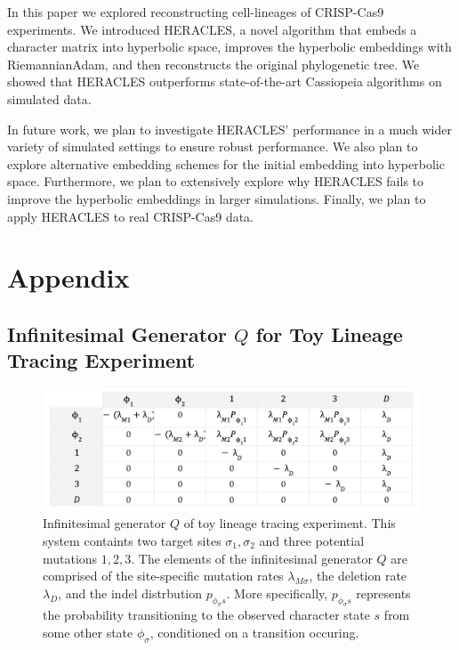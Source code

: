 \documentclass{article}
\begin{document}
In this paper we explored reconstructing cell-lineages of CRISP-Cas9 experiments. We introduced HERACLES, a novel algorithm that embeds a character matrix into hyperbolic space, improves the hyperbolic embeddings with RiemannianAdam, and then reconstructs the original phylogenetic tree. We showed that HERACLES outperforms state-of-the-art Cassiopeia algorithms on simulated data.

In future work, we plan to investigate HERACLES' performance in a much wider variety of simulated settings to ensure robust performance. We also plan to explore alternative embedding schemes for the initial embedding into hyperbolic space. Furthermore, we plan to extensively explore why HERACLES fails to improve the hyperbolic embeddings in larger simulations. Finally, we plan to apply HERACLES to real CRISP-Cas9 data.




\section*{Appendix}

\subsection*{Infinitesimal Generator $Q$ for Toy Lineage Tracing Experiment}
\begin{figure}[h]
  \label{fig:Q}
  \includegraphics[width=\linewidth]{images/Q.png}
  \caption{Infinitesimal generator $Q$ of toy lineage tracing experiment.  This system containts two target sites $\sigma_1, \sigma_2$ and three potential mutations $1,2,3$. The elements of the infinitesimal generator $Q$ are comprised of the site-specific mutation rates $\lambda_{M \sigma}$, the deletion rate $\lambda_D$, and the indel distrbution $p_{\phi_\sigma s}$. More specifically, $p_{\phi_\sigma s}$ represents the probability transitioning to the observed character state $s$ from some other state $\phi_\sigma$, conditioned on a transition occuring.}
\end{figure}
\end{document}
